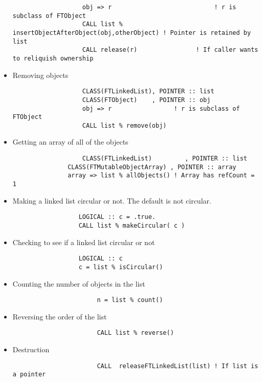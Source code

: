 \documentclass[9pt]{article}
\begin{document}
\begin{itemize}
{\begin{verbatim}
	               obj => r                            ! r is subclass of FTObject
	               CALL list % insertObjectAfterObject(obj,otherObject) ! Pointer is retained by list
	               CALL release(r)                ! If caller wants to reliquish ownership
		\end{verbatim}}
		

         \item Removing objects
		{\color{blue}\begin{verbatim}
	               CLASS(FTLinkedList), POINTER :: list
	               CLASS(FTObject)    , POINTER :: obj
	               obj => r                 ! r is subclass of FTObject
	               CALL list % remove(obj)
		\end{verbatim}}
		
         \item Getting an array of all of the objects

		{\color{blue}\begin{verbatim}
	               CLASS(FTLinkedList)         , POINTER :: list
               CLASS(FTMutableObjectArray) , POINTER :: array
               array => list % allObjects() ! Array has refCount = 1
		\end{verbatim}}

	\item Making a linked list circular or not. The default is not circular.
		{\color{blue}\begin{verbatim}
	              LOGICAL :: c = .true.
	              CALL list % makeCircular( c )
		\end{verbatim}}
		
	\item Checking to see if a linked list circular or not
		{\color{blue}\begin{verbatim}
	              LOGICAL :: c 
	              c = list % isCircular()
		\end{verbatim}}
		
         \item Counting the number of objects in the list

		{\color{blue}\begin{verbatim}
		               n = list % count()
		\end{verbatim}}
		
         \item Reversing the order of the list

		{\color{blue}\begin{verbatim}
		               CALL list % reverse()
		\end{verbatim}}

         \item Destruction
         
		{\color{blue}\begin{verbatim}
		               CALL  releaseFTLinkedList(list) ! If list is a pointer
		\end{verbatim}}
\end{itemize}
\end{document}
